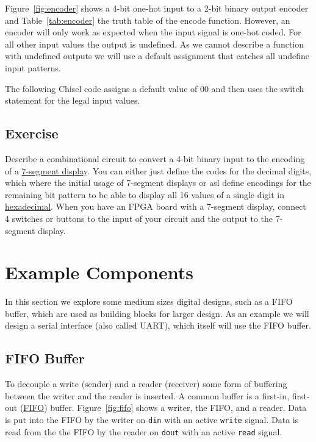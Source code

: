 \documentclass[%
    10pt, %
    headinclude, footexclude,
    openright, %
    notitlepage,
    cleardoubleempty,
    headsepline,
    pointlessnumbers,
    bibtotoc, idxtotoc,
    ]{scrbook}
\newcommand{\code}[1]{{\small{\texttt{#1}}}}
\newcommand{\myref}[2]{\href{#1}{#2}}
\begin{document}
Figure~\ref{fig:encoder} shows a 4-bit one-hot input to a 2-bit binary output encoder and
Table~\ref{tab:encoder} the truth table of the encode function. However, an encoder will
only work as expected when the input signal is one-hot coded. For all other input values the output
is undefined. As we cannot describe a function with undefined outputs we will use a default
assignment that catches all undefine input patterns.

The following Chisel code assigns a default value of 00 and then uses the switch statement
for the legal input values.



\section{Exercise}

Describe a combinational circuit to convert a 4-bit binary input to the encoding of a
\myref{https://en.wikipedia.org/wiki/Seven-segment_display}{7-segment display}.
You can either just define the codes for the decimal digits, which where the initial
usage of 7-segment displays or asl define encodings for the remaining bit pattern
to be able to display all 16 values of a single digit in
\myref{https://en.wikipedia.org/wiki/Hexadecimal}{hexadecimal}.
When you have an FPGA board with a 7-segment display, connect 4 switches or
buttons to the input of your circuit and the output to the 7-segment display.

\chapter{Example Components}

In this section we explore some medium sizes digital designs, such as
a FIFO buffer, which are used as building blocks for larger design.
As an example we will design a serial interface (also called UART),
which itself will use the FIFO buffer.

\section{FIFO Buffer}

To decouple a write (sender) and a reader (receiver) some form
of buffering between the writer and the reader is inserted.
A common buffer is a first-in, first-out
(\href{https://en.wikipedia.org/wiki/FIFO_%28computing_and_electronics%29}{FIFO})
buffer. Figure~\ref{fig:fifo} shows a writer, the FIFO, and a reader.
Data is put into the FIFO by the writer on \code{din} with an active
\code{write} signal. Data is read from the the FIFO by the reader on
\code{dout} with an active \code{read} signal.
\end{document}
